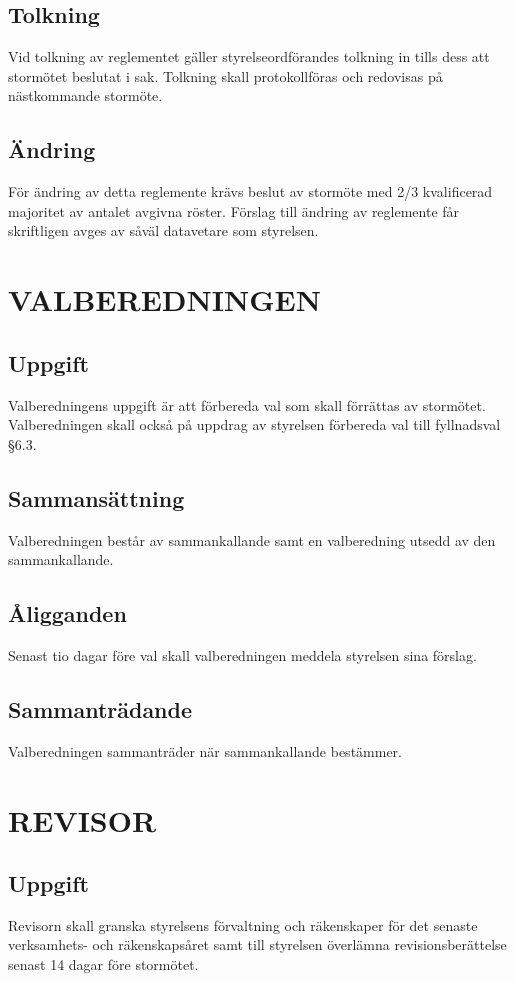 \documentclass[a4paper]{article}
\begin{document}
{{  \subsection{Tolkning}
  Vid tolkning av reglementet gäller styrelseordförandes tolkning in tills dess att stormötet beslutat i sak. Tolkning skall protokollföras och redovisas på nästkommande stormöte.
  \subsection{Ändring}
  För ändring av detta reglemente krävs beslut av stormöte med 2/3 kvalificerad majoritet av antalet avgivna röster. Förslag till ändring av reglemente får skriftligen avges av såväl datavetare som styrelsen.}
\section{VALBEREDNINGEN}
{\subsection{Uppgift}
  Valberedningens uppgift är att förbereda val som skall förrättas av stormötet. Valberedningen skall också på uppdrag av styrelsen förbereda val till fyllnadsval §6.3.
  \subsection{Sammansättning}
  Valberedningen består av sammankallande samt en valberedning utsedd av den sammankallande.
  \subsection{Åligganden}
  Senast tio dagar före val skall valberedningen meddela styrelsen sina förslag.
  \subsection{Sammanträdande}
  Valberedningen sammanträder när sammankallande bestämmer.}
\section{REVISOR}
{\subsection{Uppgift}
  Revisorn skall granska styrelsens förvaltning och räkenskaper för det senaste verksamhets- och räkenskapsåret samt till styrelsen överlämna revisionsberättelse senast 14 dagar före stormötet.
}}
\end{document}
